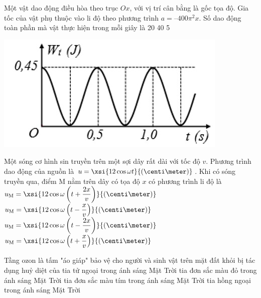 \begin{ex}
Một vật dao động điều hòa theo trục $Ox$, với vị trí cân bằng là gốc tọa độ. Gia tốc của vật phụ thuộc vào li độ theo phương trình $a=–400\pi^2 x$. Số dao động toàn phần mà vật thực hiện trong mỗi giây là
	\choice
	{20}
	{}
	{40}
	{5}
	\loigiai{}
\end{ex}
\begin{ex}
	{\vspace{-0.5cm}\includegraphics[scale=0.7]{../figs/G11-FINAL-SEM1-002-1}}
	\loigiai{}
\end{ex}
\begin{ex}
Một sóng cơ hình sin truyền trên một sợi dây rất dài với tốc độ $v$. Phương trình dao động của nguồn là $u=\xsi{12\cos\omega t}{\left(\centi\meter\right)}$. Khi có sóng truyền qua, điểm M nằm trên dây có tọa độ $x$ có phương trình li độ là
	\choice
	{$u_{\mathrm{M}}=\xsi{12\cos\omega\left(t+\dfrac{2x}{v}\right)}{\left(\centi\meter\right)}$}
	{\True $u_{\mathrm{M}}=\xsi{12\cos\omega\left(t-\dfrac{x}{v}\right)}{\left(\centi\meter\right)}$}
	{$u_{\mathrm{M}}=\xsi{12\cos\omega\left(t-\dfrac{2x}{v}\right)}{\left(\centi\meter\right)}$}
	{$u_{\mathrm{M}}=\xsi{12\cos\omega\left(t+\dfrac{x}{v}\right)}{\left(\centi\meter\right)}$}
	\loigiai{}
\end{ex}
\begin{ex}
Tầng ozon là tấm "áo giáp" bảo vệ cho người và sinh vật trên mặt đất khỏi bị tác dụng huỷ diệt của
	\choice
	{\True tia tử ngoại trong ánh sáng Mặt Trời}
	{tia đơn sắc màu đỏ trong ánh sáng Mặt Trời}
	{tia đơn sắc màu tím trong ánh sáng Mặt Trời}
	{tia hồng ngoại trong ánh sáng Mặt Trời}
	\loigiai{}
\end{ex}
